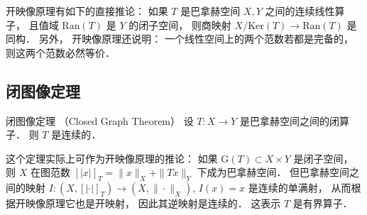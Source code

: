 开映像原理有如下的直接推论： 如果 $T$ 是巴拿赫空间 $X,Y$ 之间的连续线性算子， 且值域 $\text{Ran}(T)$ 是 $Y$ 的闭子空间， 则商映射 $X/\text{Ker}(T)\to \text{Ran}(T)$ 是同构． 另外， 开映像原理还说明： 一个线性空间上的两个范数若都是完备的， 则这两个范数必然等价．

\subsection{闭图像定理}
\begin{theorem}{闭图像定理 （Closed Graph Theorem）}
设 $T:X\to Y$ 是巴拿赫空间之间的闭算子． 则 $T$ 是连续的．
\end{theorem}
这个定理实际上可作为开映像原理的推论： 如果 $\text{G}(T)\subset X\times Y$ 是闭子空间， 则 $X$ 在图范数 $[|x|]_T=\|x\|_X+\|Tx\|_Y$ 下成为巴拿赫空间． 但巴拿赫空间之间的映射 $I:(X,[|\cdot|]_T)\to(X,\|\cdot\|_X),\,I(x)=x$ 是连续的单满射， 从而根据开映像原理它也是开映射， 因此其逆映射是连续的． 这表示 $T$ 是有界算子．
